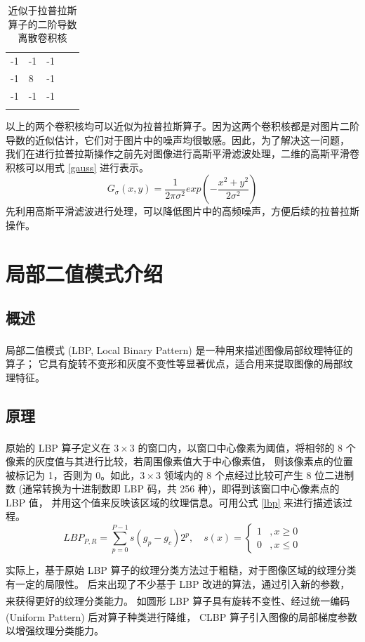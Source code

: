 \documentclass[12pt, a4paper, oneside]{ctexbook}
\begin{document}
	\begin{table}[h]
		\centering
		\begin{tabular}{lllll}
			\cline{1-3}
			\multicolumn{1}{|l|}{-1} & \multicolumn{1}{l|}{-1} & \multicolumn{1}{l|}{-1} &  &  \\ \cline{1-3}
			\multicolumn{1}{|l|}{-1} & \multicolumn{1}{l|}{8}  & \multicolumn{1}{l|}{-1} &  &  \\ \cline{1-3}
			\multicolumn{1}{|l|}{-1} & \multicolumn{1}{l|}{-1} & \multicolumn{1}{l|}{-1} &  &  \\ \cline{1-3}
			&                         &                         &  & 
		\end{tabular}
		\caption{近似于拉普拉斯算子的二阶导数离散卷积核}
	\end{table}
	以上的两个卷积核均可以近似为拉普拉斯算子。因为这两个卷积核都是对图片二阶导数的近似估计，它们对于图片中的噪声均很敏感。因此，为了解决这一问题，
	我们在进行拉普拉斯操作之前先对图像进行高斯平滑滤波处理，二维的高斯平滑卷积核可以用式 \ref{gauss} 进行表示。
	\begin{equation}	\label{gauss}
		G_\sigma (x,y)=\frac{1}{2\pi \sigma ^2} exp(-\frac{x^2+y^2}{2\sigma ^2}) 
	\end{equation}
	先利用高斯平滑滤波进行处理，可以降低图片中的高频噪声，方便后续的拉普拉斯操作。
	
	\section{局部二值模式介绍}
		\subsection{概述}
		局部二值模式 (LBP, Local Binary Pattern)\textsuperscript{\cite{8}}\textsuperscript{\cite{9}}\textsuperscript{\cite{13}} 是一种用来描述图像局部纹理特征的算子；
		它具有旋转不变形和灰度不变性等显著优点，适合用来提取图像的局部纹理特征。	
		\subsection{原理}
		原始的 LBP 算子\textsuperscript{\cite{13}}定义在 $3\times3$ 的窗口内，以窗口中心像素为阈值，将相邻的 8 个像素的灰度值与其进行比较，若周围像素值大于中心像素值，
		则该像素点的位置被标记为 1，否则为 0。如此，$3\times3$ 领域内的 8 个点经过比较可产生 8 位二进制数 (通常转换为十进制数即 LBP 码，共 256 种)，即得到该窗口中心像素点的 LBP 值，
		并用这个值来反映该区域的纹理信息。可用公式 \ref{lbp} 来进行描述该过程。
		\begin{equation}
			LBP_{P,R}=\sum_{p=0}^{P-1}s(g_p-g_c)2^{p},\quad s(x)=\begin{cases}
				1  &,x\geq0\\
				0  &,x\le0 
			\end{cases}
			\label{lbp}
		\end{equation}
		\par
		实际上，基于原始 LBP 算子的纹理分类方法过于粗糙，对于图像区域的纹理分类有一定的局限性。
		后来出现了不少基于 LBP 改进的算法，通过引入新的参数，来获得更好的纹理分类能力。
		如圆形 LBP 算子\textsuperscript{\cite{8}}具有旋转不变性、经过统一编码 (Uniform Pattern) 后对算子种类进行降维，
		CLBP 算子\textsuperscript{\cite{9}}引入图像的局部梯度参数以增强纹理分类能力。
\end{document}

